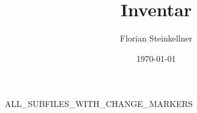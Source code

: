 \documentclass{article}
\title{Inventar}
\author{Florian Steinkellner}
\date{\today}
\begin{document}
\maketitle

\tableofcontents

\pagebreak

ALL_SUBFILES_WITH_CHANGE_MARKERS
\end{document}
